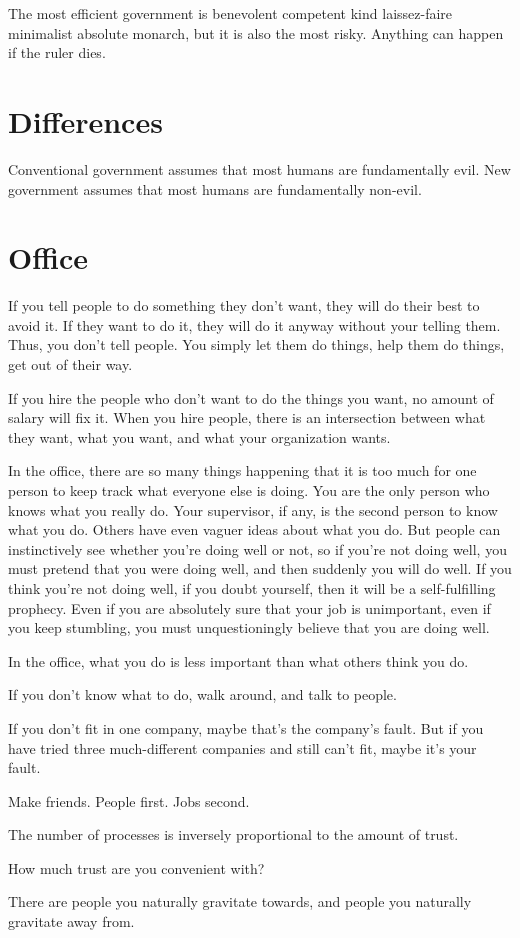 The most efficient government is
benevolent competent kind laissez-faire minimalist absolute monarch,
but it is also the most risky.
Anything can happen if the ruler dies.

\section{Differences}

Conventional government assumes that most humans are fundamentally evil.
New government assumes that most humans are fundamentally non-evil.

\section{Office}

If you tell people to do something they don't want,
they will do their best to avoid it.
If they want to do it,
they will do it anyway without your telling them.
Thus, you don't tell people.
You simply let them do things,
help them do things,
get out of their way.

If you hire the people who don't want to do the things you want,
no amount of salary will fix it.
When you hire people, there is an intersection between what they want,
what you want, and what your organization wants.

In the office, there are so many things happening that it is too much
for one person to keep track what everyone else is doing.
You are the only person who knows what you really do.
Your supervisor, if any, is the second person to know what you do.
Others have even vaguer ideas about what you do.
But people can instinctively see whether you're doing well or not,
so if you're not doing well,
you must pretend that you were doing well,
and then suddenly you will do well.
If you think you're not doing well, if you doubt yourself,
then it will be a self-fulfilling prophecy.
Even if you are absolutely sure that your job is unimportant,
even if you keep stumbling,
you must unquestioningly believe that you are doing well.

In the office, what you do is less important
than what others think you do.

If you don't know what to do, walk around, and talk to people.

If you don't fit in one company,
maybe that's the company's fault.
But if you have tried three much-different companies
and still can't fit, maybe it's your fault.

Make friends.
People first.
Jobs second.

The number of processes is inversely proportional to the amount of trust.

How much trust are you convenient with?

There are people you naturally gravitate towards,
and people you naturally gravitate away from.
